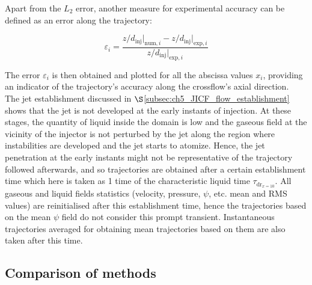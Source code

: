 Apart from the $L_2$ error, another measure for experimental accuracy can be defined as an error along the trajectory:



\begin{equation}
\label{eq:error_along_trajectory}
\varepsilon_i  =  \frac{ z/d_\mathrm{inj} \Bigr|_{\mathrm{num},i} - z/d_\mathrm{inj} \Bigr|_{\mathrm{exp},i} }{ z/d_\mathrm{inj} \Bigr|_{\mathrm{exp},i} }
\end{equation}

The error $\varepsilon_i$ is then obtained and plotted for all the abscissa values $x_i$, providing an indicator of the trajectory’s accuracy along the crossflow’s axial direction. \\


The jet establishment discussed in $\S$\ref{subsec:ch5_JICF_flow_establishment} shows that the jet is not developed at the early instants of injection. At these stages, the quantity of liquid inside the domain is low and the gaseous field at the vicinity of the injector is not perturbed by the jet along the region where instabilities are developed and the jet starts to atomize. Hence, the jet penetration at the early instants might not be representative of the trajectory followed afterwards, and so trajectories are obtained after a certain establishment time which here is taken as 1 time of the characteristic liquid time $\tau_{\mathrm{dr}_{x=10}}$. All gaseous and liquid fields statistics (velocity, pressure, $\psi$, etc. mean and RMS values) are reinitialised after this establishment time, hence the trajectories based on the mean $\psi$ field do not consider this prompt transient. Instantaneous trajectories averaged for obtaining mean trajectories based on them are also taken after this time.

\clearpage


\subsection{Comparison of methods}

